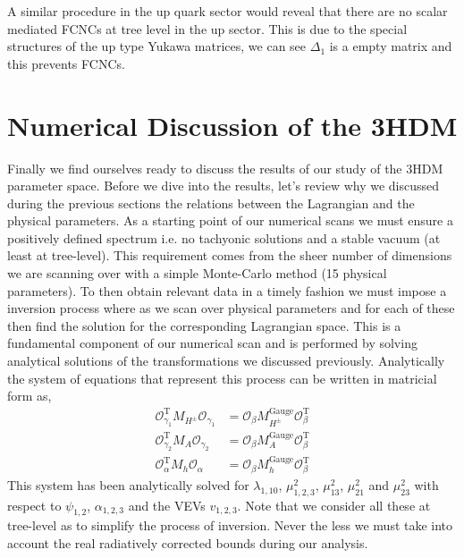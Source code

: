 A similar procedure in the up quark sector would reveal that there are no scalar mediated FCNCs at tree level in
the up sector. 
%
This is due to the special structures of the up type Yukawa matrices, we can see $\Delta_1$ is a empty matrix and this prevents FCNCs.
\section{Numerical Discussion of the 3HDM} 

Finally we find ourselves ready to discuss the results of our study of the 3HDM parameter space.
%
Before we dive into the results, let's review why we discussed during the previous sections the relations between the Lagrangian and the physical parameters. 
%
As a starting point of our numerical scans we must ensure a positively defined spectrum i.e. no tachyonic solutions and a stable vacuum (at least at tree-level). %
% 
This requirement comes from the sheer number of dimensions we are scanning over with a simple Monte-Carlo method (15 physical parameters).
% 
To then obtain relevant data in a timely fashion we must impose a inversion process where as we scan over physical parameters and for each of these then find the solution for the corresponding Lagrangian space.  
% 
This is a fundamental component of our numerical scan and is performed by solving analytical solutions of the transformations we discussed previously.  Analytically the system of equations that represent this process can be written in matricial form as, 
%
\begin{align} 
\label{tired}
     \mathcal{O}_{\gamma_1}^{\text{T}} M_{H^\pm} \mathcal{O_{\gamma_1}} & = \mathcal{O}_\beta  M_{H^\pm}^{\text{Gauge}} \mathcal{O}_\beta^{\text{T}} \\ 
     \mathcal{O}_{\gamma_2}^{\text{T}}  M_{A} \mathcal{O_{\gamma_2}} & = \mathcal{O}_\beta  M_{A}^{\text{Gauge}} \mathcal{O}_\beta^{\text{T}} \\ 
     \mathcal{O}_{\alpha}^{\text{T}} M_{h}       \mathcal{O}_{\alpha} &  = \mathcal{O}_\beta  M_{h}^{\text{Gauge}} \mathcal{O}_\beta^{\text{T}} 
\end{align} 
%
This system has been analytically solved for $\lambda_{1,10}$, $\mu^2_{1,2,3}$, $\mu_{13}^2$, $\mu_{21}^2$ and $\mu_{23}^2$ with respect to $\psi_{1,2}$, $\alpha_{1,2,3}$ and the VEVs $v_{1,2,3}$.
%
Note that we consider all these at tree-level as to simplify the process of inversion. 
%
Never the less we must take into account the real radiatively corrected bounds during our analysis. 
